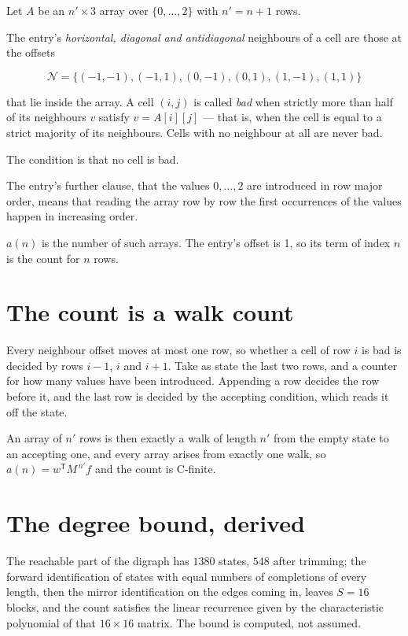 \documentclass[11pt]{article}
\theoremstyle{definition}
\begin{document}
Let $A$ be an $n' \times 3$ array over $\{0,\dots,2\}$ with $n' = n + 1$ rows.

The entry's {\itshape horizontal, diagonal and antidiagonal} neighbours of a cell are those at the offsets

\[\mathcal{N} = \{(-1,-1), (-1,1), (0,-1), (0,1), (1,-1), (1,1)\}\]

that lie inside the array. A cell $(i,j)$ is called {\itshape bad} when strictly more than half of its neighbours $v$ satisfy $v = A[i][j]$ --- that is, when the cell is equal to a strict majority of its neighbours. Cells with no neighbour at all are never bad.

The condition is that no cell is bad.

The entry's further clause, that the values $0,\dots,2$ are introduced in row major order, means that reading the array row by row the first occurrences of the values happen in increasing order.

$a(n)$ is the number of such arrays. The entry's offset is 1, so its term of index $n$ is the count for $n$ rows.

\section{The count is a walk count}

Every neighbour offset moves at most one row, so whether a cell of row $i$ is bad is decided by rows $i-1$, $i$ and $i+1$. Take as state the last two rows, and a counter for how many values have been introduced. Appending a row decides the row before it, and the last row is decided by the accepting condition, which reads it off the state.

An array of $n'$ rows is then exactly a walk of length $n'$ from the empty state to an accepting one, and every array arises from exactly one walk, so $a(n) = w^{\mathsf T}M^{\,n'}f$ and the count is C-finite.

\section{The degree bound, derived}

The reachable part of the digraph has $1380$ states, $548$ after trimming; the forward identification of states with equal numbers of completions of every length, then the mirror identification on the edges coming in, leaves $S = 16$ blocks, and the count satisfies the linear recurrence given by the characteristic polynomial of that $16\times16$ matrix. The bound is computed, not assumed.
\end{document}
